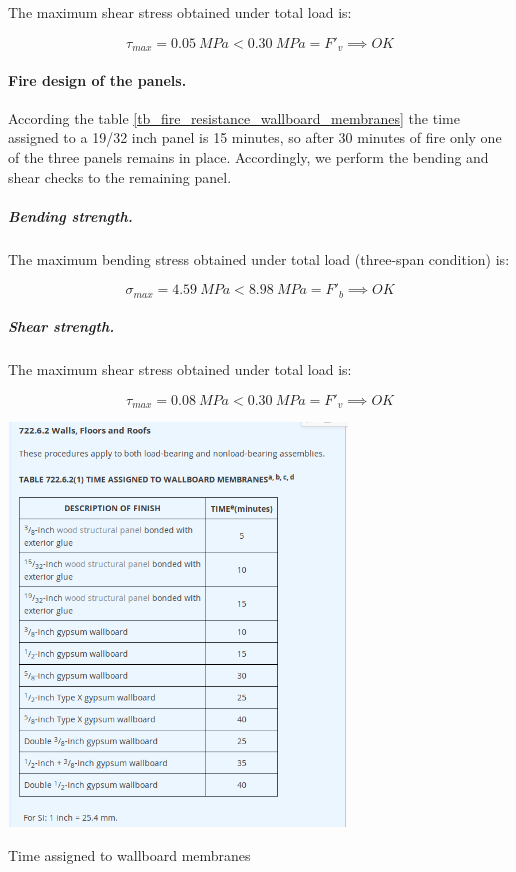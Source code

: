 The maximum shear stress obtained under total load is:

\begin{equation}
  \tau_{max}= 0.05\ MPa < 0.30\ MPa = F'_v \implies OK
\end{equation}

\paragraph{Fire design of the panels.}
According the table \ref{tb_fire_resistance_wallboard_membranes} the time assigned to a 19/32 inch panel is 15 minutes, so after 30 minutes of fire only one of the three panels remains in place. Accordingly, we perform the bending and shear checks to the remaining panel.

\subparagraph{Bending strength.}
The maximum bending stress obtained under total load (three-span condition) is:

\begin{equation}
  \sigma_{max}= 4.59\ MPa < 8.98\ MPa = F'_b \implies OK
\end{equation}


\subparagraph{Shear strength.}
The maximum shear stress obtained under total load is:

\begin{equation}
  \tau_{max}= 0.08\ MPa < 0.30\ MPa = F'_v \implies OK
\end{equation}


\begin{table}
  \begin{center}
    \includegraphics[width= 90mm]{figures/fire_resistance_wallboard_membranes}
  \end{center}
  \caption{Time assigned to wallboard membranes}\label{tb_fire_resistance_wallboard_membranes}
\end{table}


